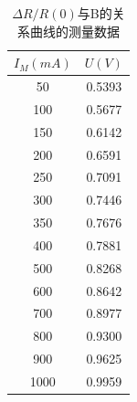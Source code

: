 \documentclass[12pt]{article}
\begin{document}
\begin{table}[H]
    \centering
    \begin{tabular}{|c|c|}
    \hline
    $I_M(mA)$ & $U(V)$ \\ \hline
    50        & 0.5393 \\ \hline
    100       & 0.5677 \\ \hline
    150       & 0.6142 \\ \hline
    200       & 0.6591 \\ \hline
    250       & 0.7091 \\ \hline
    300       & 0.7446 \\ \hline
    350       & 0.7676 \\ \hline
    400       & 0.7881 \\ \hline
    500       & 0.8268 \\ \hline
    600       & 0.8642 \\ \hline
    700       & 0.8977 \\ \hline
    800       & 0.9300 \\ \hline
    900       & 0.9625 \\ \hline
    1000      & 0.9959 \\ \hline
    \end{tabular}
    \caption{$\Delta R / R(0)$与B的关系曲线的测量数据}
    \label{tab:a4}
\end{table}
\end{document}
